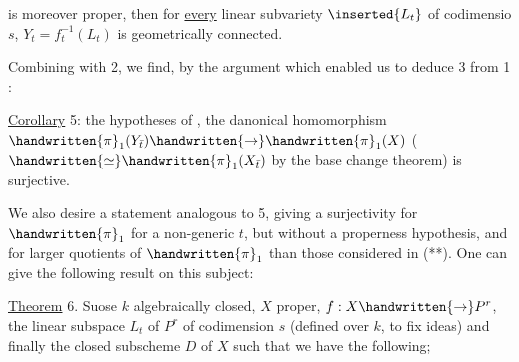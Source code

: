 is moreover proper, then for \uline{every} linear subvariety $\inserted{L_t}$ of codimensio $s$, $Y_t=f_t^{-1}(L_t)$ is geometrically connected.

Combining with 2, we find, by the argument which enabled us to deduce 3 from 1 :

\uline{Corollary} 5:  the hypotheses of  ,  the danonical homomorphism $\handwritten{\pi}_1(Y_{\bar t})\handwritten{\rightarrow}\handwritten{\pi}_1(X)$ ($\handwritten{\simeq}\handwritten{\pi}_1(X_{\bar t})$ by the base change theorem) is surjective.

We also desire a statement analogous to 5, giving a surjectivity for $\handwritten{\pi}_1$ for a non-generic $t$, but without a properness hypothesis, and for larger quotients of $\handwritten{\pi}_1$ than those considered in (**). One can give the following result on this subject:

\uline{Theorem} 6. Suose $k$ algebraically closed,  $X$ proper, $f:X\handwritten{\rightarrow}P^r$,  the linear subspace $L_t$ of $P^r$ of codimension $s$ (defined over $k$, to fix ideas)  and finally the closed subscheme $D$ of $X$ such that we have the following; 

